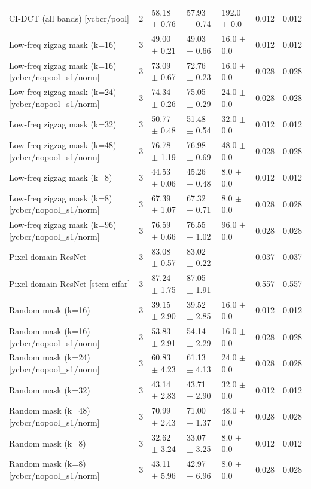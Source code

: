 \begin{tabular}{lrlllrr}
CI-DCT (all bands) [ycbcr/pool] & 2 & 58.18 $\pm$ 0.76 & 57.93 $\pm$ 0.74 & 192.0 $\pm$ 0.0 & 0.012 & 0.012 \\
Low-freq zigzag mask (k=16) & 3 & 49.00 $\pm$ 0.21 & 49.03 $\pm$ 0.66 & 16.0 $\pm$ 0.0 & 0.012 & 0.012 \\
Low-freq zigzag mask (k=16) [ycbcr/nopool_s1/norm] & 3 & 73.09 $\pm$ 0.67 & 72.76 $\pm$ 0.23 & 16.0 $\pm$ 0.0 & 0.028 & 0.028 \\
Low-freq zigzag mask (k=24) [ycbcr/nopool_s1/norm] & 3 & 74.34 $\pm$ 0.26 & 75.05 $\pm$ 0.29 & 24.0 $\pm$ 0.0 & 0.028 & 0.028 \\
Low-freq zigzag mask (k=32) & 3 & 50.77 $\pm$ 0.48 & 51.48 $\pm$ 0.54 & 32.0 $\pm$ 0.0 & 0.012 & 0.012 \\
Low-freq zigzag mask (k=48) [ycbcr/nopool_s1/norm] & 3 & 76.78 $\pm$ 1.19 & 76.98 $\pm$ 0.69 & 48.0 $\pm$ 0.0 & 0.028 & 0.028 \\
Low-freq zigzag mask (k=8) & 3 & 44.53 $\pm$ 0.06 & 45.26 $\pm$ 0.48 & 8.0 $\pm$ 0.0 & 0.012 & 0.012 \\
Low-freq zigzag mask (k=8) [ycbcr/nopool_s1/norm] & 3 & 67.39 $\pm$ 1.07 & 67.32 $\pm$ 0.71 & 8.0 $\pm$ 0.0 & 0.028 & 0.028 \\
Low-freq zigzag mask (k=96) [ycbcr/nopool_s1/norm] & 3 & 76.59 $\pm$ 0.66 & 76.55 $\pm$ 1.02 & 96.0 $\pm$ 0.0 & 0.028 & 0.028 \\
Pixel-domain ResNet & 3 & 83.08 $\pm$ 0.57 & 83.02 $\pm$ 0.22 &  & 0.037 & 0.037 \\
Pixel-domain ResNet [stem cifar] & 3 & 87.24 $\pm$ 1.75 & 87.05 $\pm$ 1.91 &  & 0.557 & 0.557 \\
Random mask (k=16) & 3 & 39.15 $\pm$ 2.90 & 39.52 $\pm$ 2.85 & 16.0 $\pm$ 0.0 & 0.012 & 0.012 \\
Random mask (k=16) [ycbcr/nopool_s1/norm] & 3 & 53.83 $\pm$ 2.91 & 54.14 $\pm$ 2.29 & 16.0 $\pm$ 0.0 & 0.028 & 0.028 \\
Random mask (k=24) [ycbcr/nopool_s1/norm] & 3 & 60.83 $\pm$ 4.23 & 61.13 $\pm$ 4.13 & 24.0 $\pm$ 0.0 & 0.028 & 0.028 \\
Random mask (k=32) & 3 & 43.14 $\pm$ 2.83 & 43.71 $\pm$ 2.90 & 32.0 $\pm$ 0.0 & 0.012 & 0.012 \\
Random mask (k=48) [ycbcr/nopool_s1/norm] & 3 & 70.99 $\pm$ 2.43 & 71.00 $\pm$ 1.37 & 48.0 $\pm$ 0.0 & 0.028 & 0.028 \\
Random mask (k=8) & 3 & 32.62 $\pm$ 3.24 & 33.07 $\pm$ 3.25 & 8.0 $\pm$ 0.0 & 0.012 & 0.012 \\
Random mask (k=8) [ycbcr/nopool_s1/norm] & 3 & 43.11 $\pm$ 5.96 & 42.97 $\pm$ 6.96 & 8.0 $\pm$ 0.0 & 0.028 & 0.028 \\

\end{tabular}
